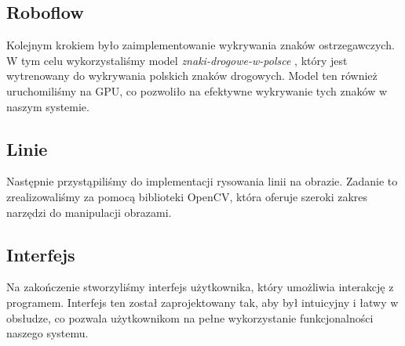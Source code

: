 \subsection*{Roboflow}

Kolejnym krokiem było zaimplementowanie wykrywania znaków ostrzegawczych.
W tym celu wykorzystaliśmy model \textit{znaki-drogowe-w-polsce} \citep[zobacz:][]{ZnakiWPolsce}, który jest wytrenowany do wykrywania polskich znaków drogowych. Model ten również uruchomiliśmy na GPU, co pozwoliło na efektywne wykrywanie tych znaków w naszym systemie.

\subsection*{Linie}

Następnie przystąpiliśmy do implementacji rysowania linii na obrazie. Zadanie to zrealizowaliśmy za pomocą biblioteki OpenCV, która oferuje szeroki zakres narzędzi do manipulacji obrazami.

\subsection*{Interfejs}

Na zakończenie stworzyliśmy interfejs użytkownika, który umożliwia interakcję z programem. Interfejs ten został zaprojektowany tak, aby był intuicyjny i łatwy w obsłudze, co pozwala użytkownikom na pełne wykorzystanie funkcjonalności naszego systemu.
